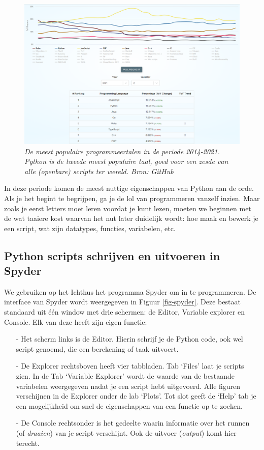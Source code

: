 \documentclass[a4paper,11pt, fleqn]{article}
\begin{document}
\begin{figure}[h]
	\includegraphics[width=16cm]{inc/h1/github_languages.png}
	\caption{\it De meest populaire programmeertalen in de periode 2014-2021. Python is de tweede meest populaire taal, goed voor een zesde van alle (openbare) scripts ter wereld. \textit{Bron: GitHub}}
	\label{github-languages}
\end{figure}

In deze periode komen de meest nuttige eigenschappen van Python aan de orde. Als je het begint te begrijpen, ga je de lol van programmeren vanzelf inzien. Maar zoals je eerst letters moet leren voordat je kunt lezen, moeten we beginnen met de wat taaiere kost waarvan het nut later duidelijk wordt: hoe maak en bewerk je een script, wat zijn datatypes, functies, variabelen, etc.

\subsection{Python scripts schrijven en uitvoeren in Spyder}
We gebruiken op het Ichthus het programma Spyder om in te programmeren. De interface van Spyder wordt weergegeven in Figuur \ref{fig-spyder}. Deze bestaat standaard uit \'e\'en window met drie schermen: de Editor, Variable explorer en Console. Elk van deze heeft zijn eigen functie:
\begin{itemize}
\item[-] Het scherm links is de Editor. Hierin schrijf je de Python code, ook wel script genoemd, die een berekening of taak uitvoert. 
\item[-] De Explorer rechtsboven heeft vier tabbladen. Tab `Files' laat je scripts zien. In de Tab `Variable Explorer' wordt de waarde van de bestaande variabelen weergegeven nadat je een script hebt uitgevoerd. Alle figuren verschijnen in de Explorer onder de lab `Plots'. Tot slot geeft de `Help' tab je een mogelijkheid om snel de eigenschappen van een functie op te zoeken.
\item[-] De Console rechtsonder is het gedeelte waarin informatie over het runnen (of \textit{draaien}) van je script verschijnt. Ook de uitvoer (\textit{output}) komt hier terecht.
\end{itemize}
\end{document}
